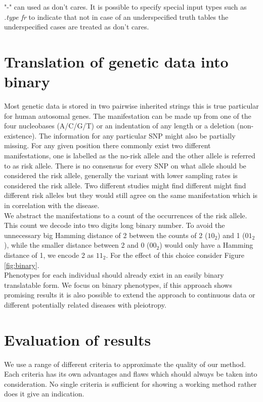\documentclass[letterpaper, 11pt]{article}
\begin{document}
"-" can used as don't cares. It is possible to specify special input types such as  \emph{.type fr} to indicate that not in case of an underspecified truth tables the underspecified cases are treated as don't cares. 


\section{Translation of genetic data into binary}
\label{sec:encode}
Most genetic data is stored in two pairwise inherited strings this is true particular for human autosomal genes. The manifestation can be made up from one of the four nucleobases (A/C/G/T) or an indentation of any length or a deletion (non-existence). The information for any particular SNP might also be partially missing. For any given position there commonly exist two different manifestations, one is labelled as the no-risk allele and the other allele is referred to as risk allele. There is no consensus for every SNP on what allele should be considered the risk allele, generally the variant with lower sampling rates is considered the risk allele. Two different studies might find different might find different risk alleles but they would still agree on the same manifestation which is in correlation with the disease. \\


We abstract the manifestations to a count of the occurrences of the risk allele. This count we decode into two digits long binary number. To avoid the unnecessary big Hamming distance of 2 between the counts of 2 ($10_2$) and 1 ($01_2$), while the smaller distance between 2 and 0 ($00_2$) would only have a Hamming distance of 1, we encode 2 as $11_2$. For the effect of this choice consider Figure \ref{fig:binary}.\\

Phenotypes for each individual should already exist in an easily binary translatable form.  We focus on binary phenotypes, if this approach shows promising results it is also possible to extend the approach to continuous  data or different potentially related diseases with pleiotropy. 

\section{Evaluation of results}
\label{sec:evaluate}
We use a range of different criteria to approximate the quality of our method. Each criteria has its own advantages and flaws which should always be taken into consideration. No single criteria is sufficient for showing a working method rather does it give an indication.
\end{document}
